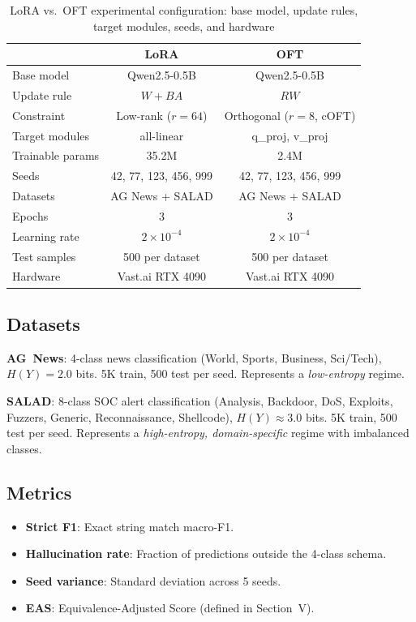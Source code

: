 \documentclass[review,3p]{elsarticle}
\begin{document}
\begin{table}[!ht]
\centering\caption{LoRA vs.\ OFT experimental configuration: base model, update rules, target modules, seeds, and hardware}
\label{tab:config}
\begin{tabular}{lcc}
\toprule & \textbf{LoRA} & \textbf{OFT} \\
\midrule
Base model & Qwen2.5-0.5B & Qwen2.5-0.5B \\
Update rule & $W + BA$ & $RW$ \\
Constraint & Low-rank ($r=64$) & Orthogonal ($r=8$, cOFT) \\
Target modules & all-linear & q\_proj, v\_proj \\
Trainable params & 35.2M & 2.4M \\
Seeds & 42, 77, 123, 456, 999 & 42, 77, 123, 456, 999 \\
Datasets & AG News + SALAD & AG News + SALAD \\
Epochs & 3 & 3 \\
Learning rate & $2\times10^{-4}$ & $2\times10^{-4}$ \\
Test samples & 500 per dataset & 500 per dataset \\
Hardware & Vast.ai RTX 4090 & Vast.ai RTX 4090 \\
\bottomrule
\end{tabular}
\end{table}

\subsection{Datasets}
\textbf{AG~News}: 4-class news classification (World, Sports, Business, Sci/Tech), $H(Y) = 2.0$ bits. 5K train, 500 test per seed. Represents a \emph{low-entropy} regime.

\textbf{SALAD}: 8-class SOC alert classification (Analysis, Backdoor, DoS, Exploits, Fuzzers, Generic, Reconnaissance, Shellcode), $H(Y) \approx 3.0$ bits. 5K train, 500 test per seed. Represents a \emph{high-entropy, domain-specific} regime with imbalanced classes.

\subsection{Metrics}
\begin{itemize}
\item \textbf{Strict F1}: Exact string match macro-F1.
\item \textbf{Hallucination rate}: Fraction of predictions outside the 4-class schema.
\item \textbf{Seed variance}: Standard deviation across 5 seeds.
\item \textbf{EAS}: Equivalence-Adjusted Score (defined in Section~V).
\end{itemize}
\end{document}

